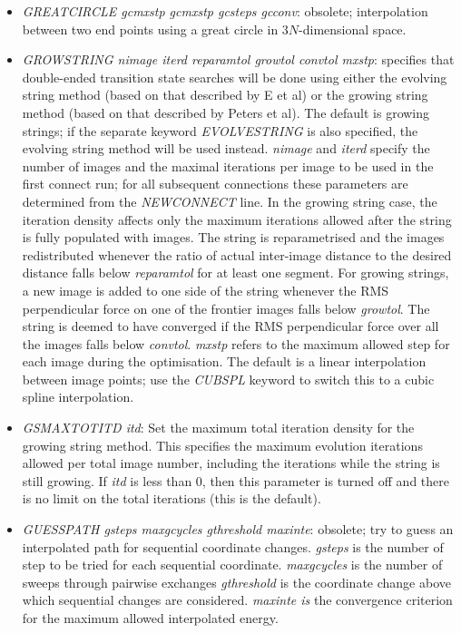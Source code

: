\documentclass[12pt,a4paper,dvips]{article}
\begin{document}
\begin{itemize}
\item {\it GREATCIRCLE gcmxstp gcmxstp gcsteps gcconv\/}: obsolete;
interpolation between two end points using a great circle in $3N$-dimensional
space.

\item {\it GROWSTRING nimage iterd reparamtol growtol convtol mxstp\/}:
  specifies that double-ended transition state searches will be done using
  either the evolving string method (based on that described by E et
  al\cite{ERV02}) or the growing string method (based on that described by
  Peters et al\cite{PetersHBC04}). The default is growing strings; if the
  separate keyword {\it EVOLVESTRING} is also specified, the evolving string
  method will be used instead. {\it nimage\/} and {\it iterd\/} specify the
  number of images and the maximal iterations per image to be used in the
  first connect run; for all subsequent connections these parameters are
  determined from the {\it NEWCONNECT\/} line. In the growing string case, the
  iteration density affects only the maximum iterations allowed after the
  string is fully populated with images. The string is reparametrised and the
  images redistributed whenever the ratio of actual inter-image distance to
  the desired distance falls below {\it reparamtol\/} for at least one
  segment.  For growing strings, a new image is added to one side of the
  string whenever the RMS perpendicular force on one of the frontier images
  falls below {\it growtol\/}. The string is deemed to have converged if the
  RMS perpendicular force over all the images falls below {\it convtol\/}.
  {\it mxstp\/} refers to the maximum allowed step for each image during the
  optimisation. The default is a linear interpolation between image points;
  use the {\it CUBSPL\/} keyword to switch this to a cubic spline interpolation.

\item {\it GSMAXTOTITD itd\/}: Set the maximum total iteration density for the
  growing string method. This specifies the maximum evolution iterations allowed per
  total image number, including the iterations while the string is still
  growing. If {\it itd\/} is less than 0, then this parameter is turned off
  and there is no limit on the total iterations (this is the default).

\item {\it GUESSPATH gsteps maxgcycles gthreshold maxinte\/}:
obsolete;
try to guess an interpolated path for sequential coordinate changes.
{\it gsteps\/} is the number of step to be tried for each sequential coordinate.
{\it maxgcycles\/} is the number of sweeps through pairwise exchanges
{\it gthreshold\/} is the coordinate change above which sequential changes are considered.
{\it maxinte is\/} the convergence criterion for the maximum allowed interpolated energy.


\end{itemize}
\end{document}
